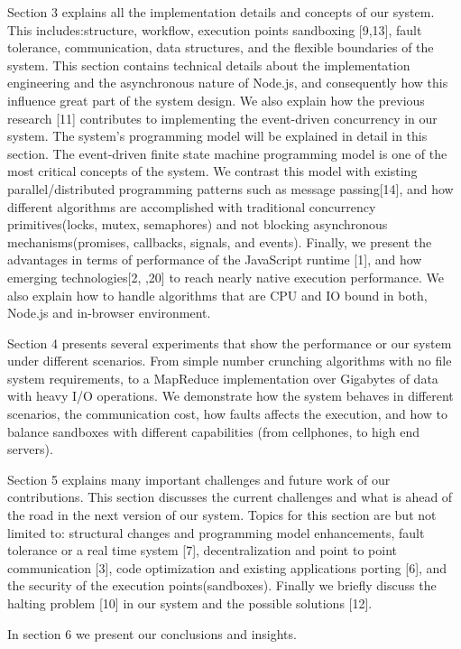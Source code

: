 \documentclass[10pt,reprint]{socc14}
\begin{document}
Section 3 explains all the implementation details and concepts of our system. This includes:structure, workflow, execution points sandboxing [9,13], fault tolerance, communication, data structures, and the flexible boundaries of the system. This section contains technical details about the implementation engineering and the asynchronous nature of Node.js, and consequently  how this  influence great part of the system design. We also explain how the previous research [11] contributes to implementing the event-driven concurrency in our system. The system's programming model will be explained in detail in this section. The event-driven finite state machine programming model is one of the most critical concepts of the system. We contrast this model with existing parallel/distributed programming patterns such as message passing[14], and how different algorithms are accomplished with traditional concurrency primitives(locks, mutex, semaphores) and not blocking asynchronous mechanisms(promises, callbacks, signals, and events). Finally, we present the advantages in terms of performance of the JavaScript runtime [1], and how emerging technologies[2, ,20] to reach nearly native execution performance. We also explain how to handle algorithms that are CPU and IO bound in both, Node.js and in-browser environment.

Section 4 presents several experiments that show the performance or our system  under different scenarios. From simple number crunching algorithms with no file system requirements, to a MapReduce implementation over Gigabytes of data with heavy I/O operations. We demonstrate how the system behaves in different scenarios, the communication cost, how faults affects the execution, and how to balance sandboxes with different capabilities (from cellphones, to high end servers).

Section 5 explains many important challenges and future work of our contributions. This section discusses the current challenges and what is ahead of the road in the next version of our system. Topics for this section are but not limited to: structural changes and programming model enhancements, fault tolerance or a real time system [7], decentralization and point to point communication [3], code optimization and existing applications porting [6],  and the security of the execution points(sandboxes). Finally we briefly discuss the halting problem [10] in our system and the possible solutions [12].

In section 6 we present our conclusions and insights.
\end{document}
